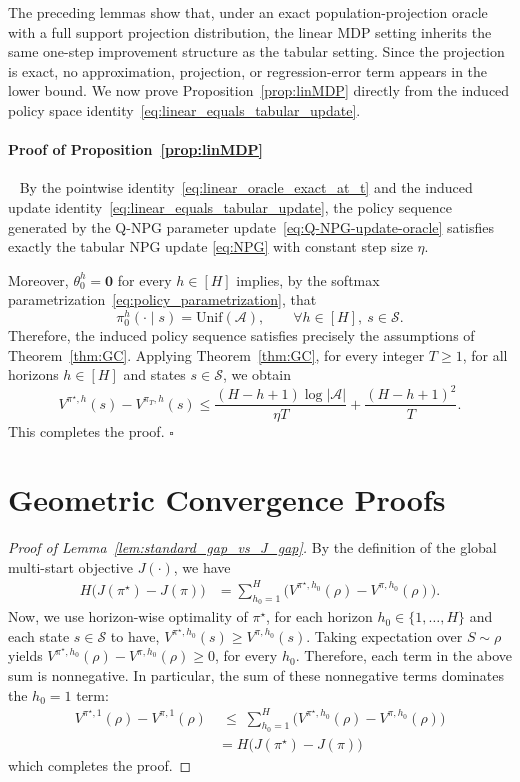 \documentclass[11pt]{article}
\begin{document}
The preceding lemmas show that, under an exact population-projection oracle with a full support projection distribution, the
linear MDP setting inherits the same one-step improvement structure as the tabular setting.
Since the projection is exact, no approximation, projection, or regression-error term appears in
the lower bound. We now prove Proposition~\ref{prop:linMDP} directly from the induced
policy space identity~\eqref{eq:linear_equals_tabular_update}. 

\paragraph{Proof of Proposition~\ref{prop:linMDP}}~\newline
By the pointwise identity~\eqref{eq:linear_oracle_exact_at_t} and the induced update
identity~\eqref{eq:linear_equals_tabular_update}, the policy sequence generated by the Q-NPG
parameter update~\eqref{eq:Q-NPG-update-oracle} satisfies exactly the tabular NPG update
\eqref{eq:NPG} with constant step size $\eta$.

Moreover, $\theta_0^h=\mathbf 0$ for every $h\in[H]$ implies, by the softmax
parametrization~\eqref{eq:policy_parametrization}, that
\[
\pi_0^h(\cdot\mid s)=\mathrm{Unif}(\mathcal A),
\qquad
\forall h\in[H],\ s\in\mathcal S .
\]
Therefore, the induced policy sequence satisfies precisely the assumptions of
Theorem~\ref{thm:GC}. Applying Theorem~\ref{thm:GC}, for every integer $T\ge1$, for all horizons $h\in[H]$ and states $s\in\mathcal S$, we obtain
\[
V^{\pi^\star,h}(s)-V^{\pi_T,h}(s)
\le
\frac{(H-h+1)\log|\mathcal A|}{\eta T}
+
\frac{(H-h+1)^2}{T}.
\]
This completes the proof.
\hfill
$\square$

\section{Geometric Convergence Proofs} \label{app:lin}
\begin{proof} [Proof of Lemma~\ref{lem:standard_gap_vs_J_gap}]
By the definition of the global multi-start objective $J(\cdot)$, we have
\begin{align*}
H\big(J(\pi^\star)-J(\pi)\big)
&=
\sum_{h_0=1}^H\Big(V^{\pi^\star,h_0}(\rho)-V^{\pi,h_0}(\rho)\Big).
\end{align*}
Now, we use horizon-wise optimality of $\pi^\star$, for each horizon $h_0\in\{1,\dots,H\}$ and each state $s\in\mathcal S$ to have,
$V^{\pi^\star,h_0}(s)\ge V^{\pi,h_0}(s)$. Taking expectation over $S\sim\rho$ yields
$V^{\pi^\star,h_0}(\rho)-V^{\pi,h_0}(\rho)\ge 0$, for every $h_0$. Therefore, each term in the above sum is nonnegative.
In particular, the sum of these nonnegative terms dominates the $h_0=1$ term:
\begin{align*} V^{\pi^\star,1}(\rho)-V^{\pi,1}(\rho) 
 & \;\le\;
\sum_{h_0=1}^H\Big(V^{\pi^\star,h_0}(\rho)-V^{\pi,h_0}(\rho)\Big) \\
& = H\big(J(\pi^\star)-J(\pi)\big)
\end{align*}
which completes the proof.
\end{proof}
\end{document}
